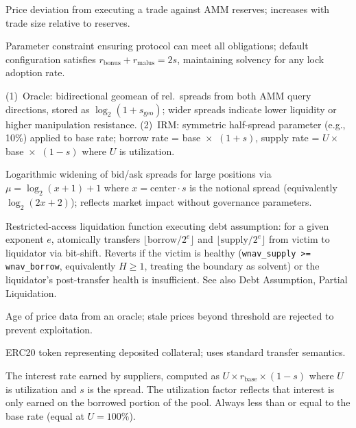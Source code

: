\documentclass[10pt,a4paper,twocolumn]{article}
\begin{document}
\begin{description}[style=nextline, leftmargin=2.5em, labelindent=0em, font=\normalfont\bfseries]
\item[Slippage] Price deviation from executing a trade against AMM reserves; increases with trade size relative to reserves.

\item[Solvency Boundary] Parameter constraint ensuring protocol can meet all obligations; default configuration satisfies $r_{\text{bonus}} + r_{\text{malus}} = 2s$, maintaining solvency for any lock adoption rate.

 \item[Spread] (1)~Oracle: bidirectional geomean of rel.\ spreads from both AMM query directions, stored as $\log_2(1 + s_{\text{geo}})$; wider spreads indicate lower liquidity or higher manipulation resistance. (2)~IRM: symmetric half-spread parameter (e.g., 10\%) applied to base rate; borrow rate = base~$\times$~$(1{+}s)$, supply rate = $U \times$ base~$\times$~$(1{-}s)$ where $U$ is utilization.

\item[Spread Scaling] Logarithmic widening of bid/ask spreads for large positions via $\mu = \log_2(x + 1) + 1$ where $x = \text{center} \cdot s$ is the notional spread (equivalently $\log_2(2x + 2)$); reflects market impact without governance parameters.

\item[Square] Restricted-access liquidation function executing debt assumption: for a given exponent $e$, atomically transfers $\lfloor\text{borrow}/2^e\rfloor$ and $\lfloor\text{supply}/2^e\rfloor$ from victim to liquidator via bit-shift. Reverts if the victim is healthy (\texttt{wnav\_supply >= wnav\_borrow}, equivalently $H \geq 1$, treating the boundary as solvent) or the liquidator's post-transfer health is insufficient. See also Debt Assumption, Partial Liquidation.

\item[Staleness] Age of price data from an oracle; stale prices beyond threshold are rejected to prevent exploitation.

\item[Supply Position] ERC20 token representing deposited collateral; uses standard transfer semantics.

\item[Supply Rate] The interest rate earned by suppliers, computed as $U \times r_{\text{base}} \times (1 - s)$ where $U$ is utilization and $s$ is the spread. The utilization factor reflects that interest is only earned on the borrowed portion of the pool. Always less than or equal to the base rate (equal at $U = 100\%$).


\end{description}
\end{document}

